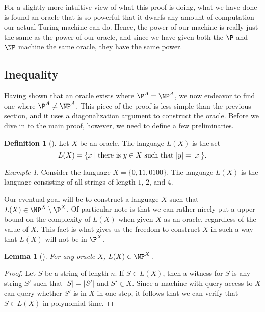 \documentclass[english]{reedthesis}
\theoremstyle{plain}
\newtheorem{lemma}[lemma]{Lemma}
\theoremstyle{definition}
\newtheorem{defn}[defn]{Definition}
\theoremstyle{remark}
\newtheorem{example}{Example}[thm]
\DeclarePairedDelimiter{\abs}{\lvert}{\rvert}
\begin{document}
For a slightly more intuitive view of what this proof is doing, what we have
done is found an oracle that is so powerful that it dwarfs any amount of
computation our actual Turing machine can do. Hence, the power of our machine is
really just the same as the power of our oracle, and since we have given both
the $\P$ and $\NP$ machine the same oracle, they have the same power.

\subsection{Inequality}

Having shown that an oracle exists where $\P^{A} = \NP^{A}$, we now endeavor to
find one where $\P^{A} \ne \NP^{A}$. This piece of the proof is less simple than
the previous section, and it uses a diagonalization argument to construct the
oracle. Before we dive in to the main proof, however, we need to define a few
preliminaries.

\begin{defn}[{\cite[436]{BGS75}}]\label{def:l(x)}
  Let $X$ be an oracle. The language $L(X)$ is the set
  \begin{equation*}
    L(X) = \{x \mid \text{there is } y \in X \text{ such that } \abs{y} = \abs{x}\}.
  \end{equation*}
\end{defn}

\begin{example}\label{ex:l(x)-simple}
  Consider the language $X = \{0, 11, 0100\}$. The language $L(X)$ is the
  language consisting of all strings of length $1$, $2$, and $4$.
\end{example}

Our eventual goal will be to construct a language $X$ such that
$L(X) \in \NP^{X} \setminus \P^{X}$. Of particular note is that we can rather nicely put a
upper bound on the complexity of $L(X)$ when given $X$ as an oracle, regardless
of the value of $X$. This fact is what gives us the freedom to construct $X$ in
such a way that $L(X)$ will not be in $\P^{X}$.

\begin{lemma}[{\cite[436]{BGS75}}]\label{lem:l(x)-in-np}
  For any oracle $X$, $L(X) \in \NP^{X}$.
\end{lemma}

\begin{proof}
  Let $S$ be a string of length $n$. If $S \in L(X)$, then a witness for $S$ is
  any string $S'$ such that $\abs{S} = \abs{S'}$ and $S' \in X$. Since a machine
  with query access to $X$ can query whether $S'$ is in $X$ in one step, it
  follows that we can verify that $S \in L(X)$ in polynomial time.
\end{proof}
\end{document}

